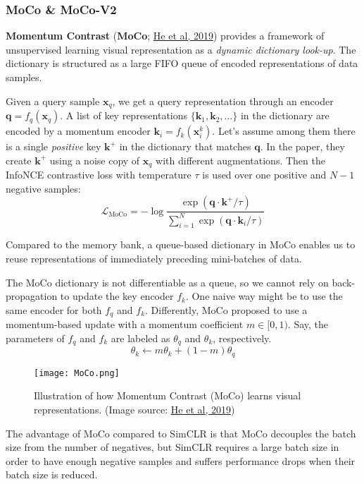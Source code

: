 \documentclass[12pt]{article}
\begin{document}
\subsubsection{MoCo \& MoCo-V2}
\textbf{Momentum Contrast} (\textbf{MoCo}; \href{https://arxiv.org/abs/1911.05722}{He et al, 2019}) provides a framework of unsupervised learning visual representation as a \emph{dynamic dictionary look-up}. The dictionary is structured as a large FIFO queue of encoded representations of data samples.

Given a query sample $\mathbf{x}_q$, we get a query representation through an encoder $\mathbf{q} = f_q(\mathbf{x}_q)$. A list of key representations $\{\mathbf{k}_1, \mathbf{k}_2, \dots \}$ in the dictionary are encoded by a momentum encoder $\mathbf{k}_i = f_k (\mathbf{x}^k_i)$. Let's assume among them there is a single \emph{positive} key $\mathbf{k}^+$ in the dictionary that matches $\mathbf{q}$. In the paper, they create $\mathbf{k}^+$ using a noise copy of $\mathbf{x}_q$ with different augmentations. Then the InfoNCE contrastive loss with temperature $\tau$ is used over one positive and $N-1$ negative samples:
\[
\mathcal{L}_\text{MoCo} = - \log \frac{\exp(\mathbf{q} \cdot \mathbf{k}^+ / \tau)}{\sum_{i=1}^N \exp(\mathbf{q} \cdot \mathbf{k}_i / \tau)}
\]

Compared to the memory bank, a queue-based dictionary in MoCo enables us to reuse representations of immediately preceding mini-batches of data.

The MoCo dictionary is not differentiable as a queue, so we cannot rely on back-propagation to update the key encoder $f_k$. One naive way might be to use the same encoder for both $f_q$ and $f_k$. Differently, MoCo proposed to use a momentum-based update with a momentum coefficient $m \in [0, 1)$. Say, the parameters of $f_q$ and $f_k$ are labeled as $\theta_q$ and $\theta_k$, respectively.
\[
\theta_k \leftarrow m \theta_k + (1-m) \theta_q
\]

\begin{figure}[H]
    \centering
    \texttt{[image: MoCo.png]}
    \caption{Illustration of how Momentum Contrast (MoCo) learns visual representations. (Image source: \href{https://arxiv.org/abs/1911.05722}{He et al, 2019})}
\end{figure}

The advantage of MoCo compared to SimCLR is that MoCo decouples the batch size from the number of negatives, but SimCLR requires a large batch size in order to have enough negative samples and suffers performance drops when their batch size is reduced.
\end{document}
